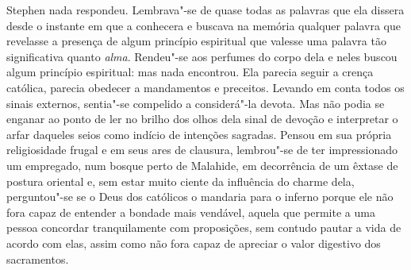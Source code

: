 Stephen nada respondeu.  Lembrava"-se de quase todas as palavras que ela dissera
desde o instante em que a conhecera e buscava na memória qualquer palavra que
revelasse a presença de algum princípio espiritual que valesse uma palavra tão
significativa quanto \textit{alma}.  Rendeu"-se aos perfumes do corpo dela e		
neles buscou algum princípio espiritual: mas nada encontrou.  Ela parecia
seguir a crença católica, parecia obedecer a mandamentos e preceitos.  Levando
em conta todos os sinais externos, sentia"-se compelido a considerá"-la devota.
Mas não podia se enganar ao ponto de ler no brilho dos olhos dela sinal de
devoção e interpretar o arfar daqueles seios como indício de
intenções sagradas.  Pensou em sua própria religiosidade frugal e em seus ares de clausura, lembrou"-se de ter impressionado um
empregado, num bosque perto de Malahide, em decorrência de um êxtase de postura
oriental e, sem estar muito ciente da influência do charme dela, perguntou"-se
se o Deus dos católicos o mandaria para o inferno porque ele não fora capaz de
entender a bondade mais vendável, aquela que permite a uma pessoa concordar
tranquilamente com proposições, sem contudo pautar a vida de acordo com elas,
assim como não fora capaz de apreciar o valor digestivo dos sacramentos.

